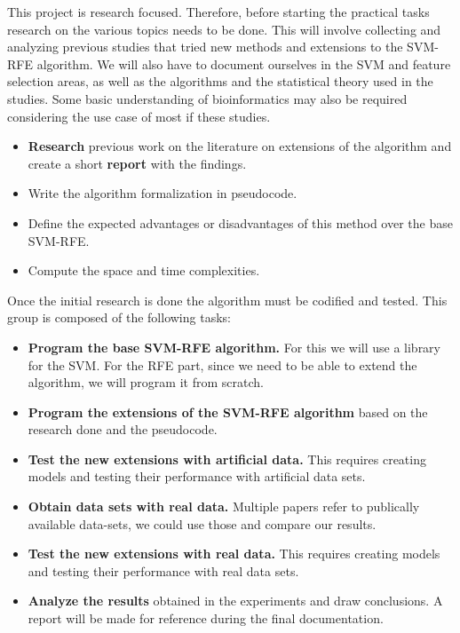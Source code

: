 This project is research focused. Therefore, before starting the practical tasks research on the various topics needs to be done. This will involve collecting and analyzing previous studies that tried new methods and extensions to the SVM-RFE algorithm. We will also have to document ourselves in the SVM and feature selection areas, as well as the algorithms and the statistical theory used in the studies. Some basic understanding of bioinformatics may also be required considering the use case of most if these studies.

\begin{itemize}
    \item \textbf{Research} previous work on the literature on extensions of the algorithm and create a short \textbf{report} with the findings.
    \item Write the algorithm formalization in pseudocode.
    \item Define the expected advantages or disadvantages of this method over the base SVM-RFE.
    \item Compute the space and time complexities.
\end{itemize}

Once the initial research is done the algorithm must be codified and tested. This group is composed of the following tasks:

\begin{itemize}
    \item \textbf{Program the base SVM-RFE algorithm.} For this we will use a library for the SVM. For the RFE part, since we need to be able to extend the algorithm, we will program it from scratch.
    \item \textbf{Program the extensions of the SVM-RFE algorithm} based on the research done and the pseudocode.
    \item \textbf{Test the new extensions with artificial data.} This requires creating models and testing their performance with artificial data sets.
    \item \textbf{Obtain data sets with real data.} Multiple papers refer to publically available data-sets, we could use those and compare our results.
    \item \textbf{Test the new extensions with real data.} This requires creating models and testing their performance with real data sets.
    \item \textbf{Analyze the results} obtained in the experiments and draw conclusions. A report will be made for reference during the final documentation.
\end{itemize}

